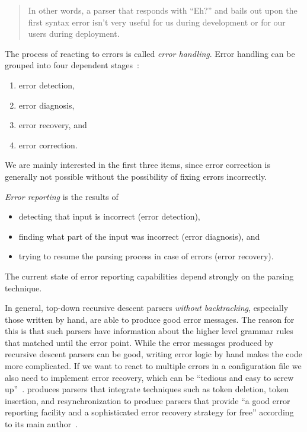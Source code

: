 \begin{quote}
  In other words, a parser that responds with “Eh?” and bails out upon the first syntax error isn’t very useful for us during development or for our users during deployment.
\end{quote}

The process of reacting to errors is called \emph{error handling}. Error handling can be grouped into four dependent stages~\cite{ruefenacht2016error, pottier2016reachability}:

\begin{enumerate}
  \item error detection,
  \item error diagnosis,
  \item error recovery, and
  \item error correction.
\end{enumerate}

We are mainly interested in the first three items, since error correction is generally not possible without the possibility of fixing errors incorrectly.

\emph{Error reporting} is the results of

\begin{itemize}
  \item detecting that input is incorrect (error detection),
  \item finding what part of the input was incorrect (error diagnosis), and
  \item trying to resume the parsing process in case of errors (error recovery).
\end{itemize}

The current state of error reporting capabilities depend strongly on the parsing technique.

In general, top-down recursive descent parsers \emph{without backtracking}, especially those written by hand, are able to produce good error messages. The reason for this is that such parsers have information about the higher level grammar rules that matched until the error point. While the error messages produced by recursive descent parsers can be good, writing error logic by hand makes the code more complicated. If we want to react to multiple errors in a configuration file we also need to implement error recovery, which can be “tedious and easy to screw up”~\cite[p. 160]{parr2013definitive}.  produces parsers that integrate techniques such as \gls{token} deletion, \gls{token} insertion, and resynchronization to produce parsers that provide “a good error reporting facility and a sophisticated error recovery strategy for free” according to its main author~\cite{parr2013definitive}.

